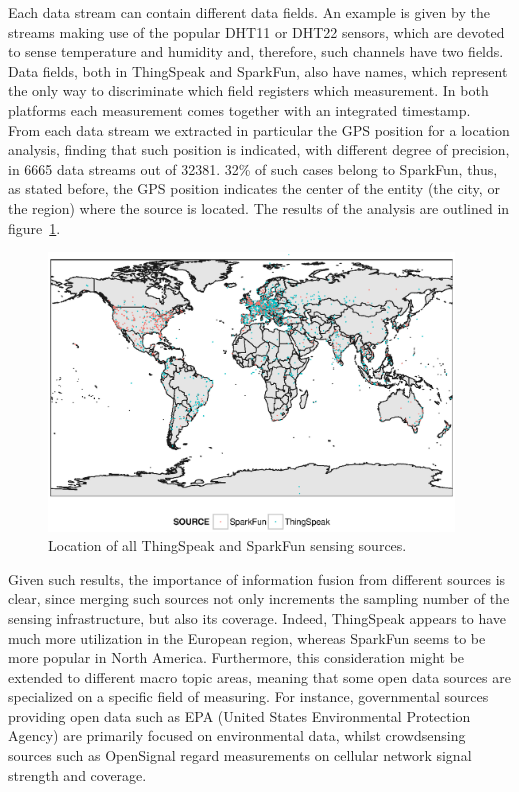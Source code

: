 Each data stream can contain different data fields.
An example is given by the streams making use of the popular DHT11 or DHT22 sensors, which are devoted to sense temperature and humidity and, therefore, such channels have two fields.
Data fields, both in ThingSpeak and SparkFun, also have names, which represent the only way to discriminate which field registers which measurement.
In both platforms each measurement comes together with an integrated timestamp.
\\

From each data stream we extracted in particular the GPS position for a location analysis, finding that such position is indicated, with different degree of precision, in 6665 data streams out of 32381.
32\% of such cases belong to SparkFun, thus, as stated before, the GPS position indicates the center of the entity (the city, or the region) where the source is located.
The results of the analysis are outlined in figure~\ref{geo}.

\begin{figure}[t]
\centering
\includegraphics[width=0.96\textwidth]{img/map.eps} 
\caption{Location of all ThingSpeak and SparkFun sensing sources.}
\label{geo}
\end{figure}

Given such results, the importance of information fusion from different sources is clear, since merging such sources not only increments the sampling number of the sensing infrastructure, but also its coverage.
Indeed, ThingSpeak appears to have much more utilization in the European region, whereas SparkFun seems to be more popular in North America.
Furthermore, this consideration might be extended to different macro topic areas, meaning that some open data sources are specialized on a specific field of measuring.
For instance, governmental sources providing open data such as EPA (United States Environmental Protection Agency) \cite{epa} are primarily focused on environmental data, whilst crowdsensing sources such as OpenSignal \cite{opensignal} regard measurements on cellular network signal strength and coverage.

